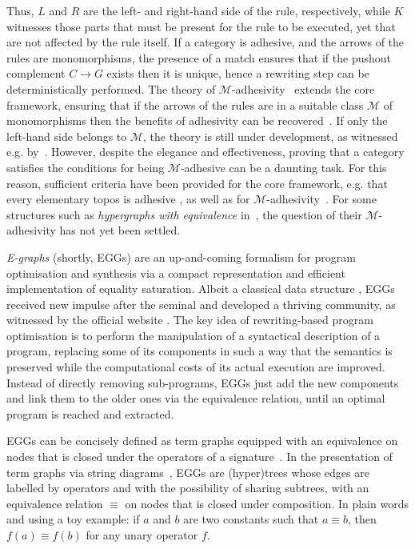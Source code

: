 \documentclass[3p]{elsarticle}
\theoremstyle{remark}
\theoremstyle{definition}
\begin{document}
Thus, $L$ and $R$ are the left- and right-hand side of the rule, respectively, while $K$ witnesses those parts that must 
be present for the rule to be executed, yet that are not affected by the rule itself.
%
If a category is adhesive, and the arrows of the rules are monomorphisms, the presence of a match ensures that
if the pushout complement $C \to G$ exists then it is unique, hence a rewriting step can be deterministically performed.
%
The theory of $\mathcal{M}$-adhesivity~\cite{azzi2019essence,heindel2009category} extends the core framework, ensuring that if the arrows 
of the rules are in a suitable class $\mathcal{M}$ of monomorphisms
then the benefits of adhesivity
can be recovered~\cite{ehrig2012,ehrig2014adhesive}. 
If only the left-hand side belongs to $\mathcal{M}$, the theory is still under development, as witnessed e.g.
by~\cite{BaldanC0G24}.
%
However, despite the elegance and effectiveness,
proving that a category satisfies the conditions 
for being $\mathcal{M}$-adhesive can be a daunting task. For this reason, sufficient criteria have been provided for the core 
framework, e.g. that every elementary topos is adhesive \cite{lack2006toposes}, as well as for %
$\mathcal{M}$-adhesivity~\cite{CastelnovoGM24}.
%
For some structures such as \emph{hypergraphs with equivalence} in~\cite{concur2006}, the question 
of their $\mathcal{M}$-adhesivity has not yet been settled.

\emph{E-graphs} (shortly, EGGs) are an up-and-coming formalism for program optimisation and synthesis via a compact 
representation and efficient implementation of equality saturation. Albeit a classical data structure \cite{DetlefsNS05}, EGGs received 
new impulse after the seminal \cite{WillseyNWFTP21} and
developed a thriving community, as witnessed by the official website \cite{eggs}.
%
The key idea of rewriting-based program optimisation is to perform the manipulation of a syntactical description 
of a program, replacing some of its components in such a way that the semantics is preserved while 
the computational costs of its actual execution are improved. Instead of directly removing sub-programs, EGGs just add the 
new components and link them to the older ones via the equivalence relation, until an optimal program is 
reached and extracted.

EGGs can be concisely defined as term graphs equipped with an equivalence on nodes
that is closed under the operators of a signature~\cite[Section~4.2]{DetlefsNS05}.
In the presentation of term graphs via string diagrams~\cite{CastelnovoGM24}, EGGs are (hyper)trees 
whose edges are labelled by operators and with
the possibility of sharing subtrees, with an equivalence relation $\equiv$ on nodes that 
is closed under composition. In plain words and using a toy example:
if $a$ and $b$ are two constants such that $a \equiv b$, then $f(a) \equiv f(b)$ for any unary operator $f$.
\end{document}
